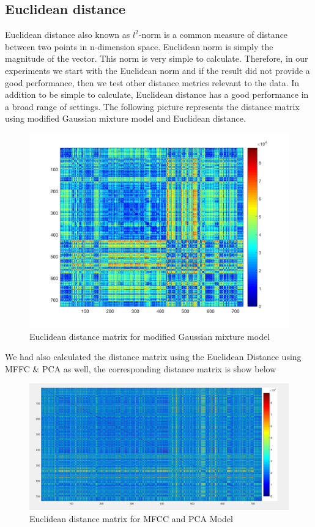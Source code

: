 \documentclass[12pt]{article}
\begin{document}
\subsection{Euclidean distance}
Euclidean distance also known as $l^2$-norm is a common measure of distance between two points in n-dimension space. Euclidean norm is simply the magnitude of the vector. This norm is very simple to calculate. Therefore, in our experiments we start with the Euclidean norm and if the result did not provide a good performance, then we test other distance metrics relevant to the data. In addition to be simple to calculate, Euclidean distance has a good performance in a broad range of settings. The following picture represents the distance matrix using modified Gaussian mixture model and Euclidean distance.
\begin{figure}[H]\label{distMat30}
	\centering
	\includegraphics[width=1\linewidth]{distMat30.jpg}
	\caption{Euclidean distance matrix for modified Gaussian mixture model}
\end{figure}
We had also calculated the distance matrix using the Euclidean Distance using MFFC $\&$ PCA as well, the corresponding distance matrix is show below
\begin{figure}[H]\label{distM20}
	\centering
	\includegraphics[width=1\linewidth]{distM20.png}
	\caption{Euclidean distance matrix for MFCC and PCA Model}
\end{figure}
\end{document}
